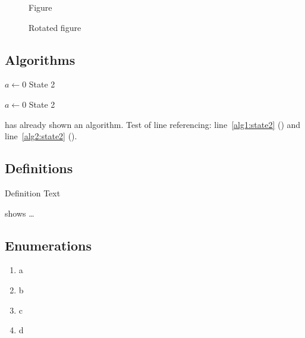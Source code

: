 \documentclass[../thesis-example-en]{subfiles}
\begin{document}
\begin{figure}
  \missingfigure{}
  \caption{Figure}
  \label{fig:Abbildung}
\end{figure}

\begin{landscape}
  \begin{figure}
    \missingfigure{}
    \caption{Rotated figure}
    \label{fig:AbbildungGedreht}
  \end{figure}
\end{landscape}

\subsection{Algorithms}

\begin{algorithm}
  \caption{$algo$}
  \label{alg:example}
  \begin{algorithmic}[1]
    \State $a \gets 0$
    \State State 2\label{alg1:state2}
  \end{algorithmic}
\end{algorithm}

\begin{algorithm}
  \caption{Algorithm 2}
  \label{alg:example2}
  \begin{algorithmic}[1]
    \State $a \gets 0$
    \State State 2\label{alg2:state2}
  \end{algorithmic}
\end{algorithm}

 has already shown an algorithm.
Test of line referencing: line~\ref{alg1:state2} () and line~\ref{alg2:state2} ().

\subsection{Definitions}
\begin{definition}[Title]
  \label{def:def1}
  Definition Text
\end{definition}

 shows \ldots

\subsection{Enumerations}

\begin{enumerate}[label={(\alph*)}]
  \item a
  \item b
  \item c
  \item d
\end{enumerate}
\end{document}
